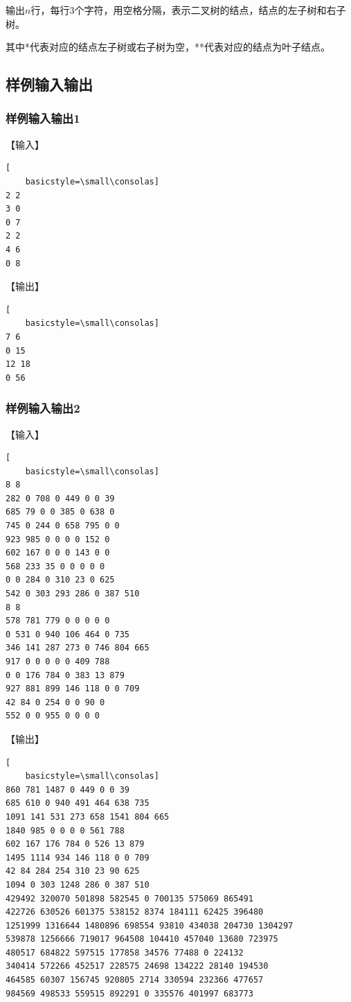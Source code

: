 \documentclass{article}
\begin{document}
输出$n$行，每行3个字符，用空格分隔，表示二叉树的结点，结点的左子树和右子树。

其中*代表对应的结点左子树或右子树为空，**代表对应的结点为叶子结点。

\subsection{样例输入输出}

\subsubsection{样例输入输出1}

【输入】

\begin{lstlisting}[
    basicstyle=\small\consolas]
2 2
3 0
0 7
2 2
4 6
0 8
\end{lstlisting}

【输出】

\begin{lstlisting}[
    basicstyle=\small\consolas]
7 6 
0 15 
12 18 
0 56 
\end{lstlisting}

\subsubsection{样例输入输出2}

【输入】

\begin{lstlisting}[
    basicstyle=\small\consolas]
8 8
282 0 708 0 449 0 0 39
685 79 0 0 385 0 638 0
745 0 244 0 658 795 0 0
923 985 0 0 0 0 152 0
602 167 0 0 0 143 0 0
568 233 35 0 0 0 0 0
0 0 284 0 310 23 0 625
542 0 303 293 286 0 387 510
8 8
578 781 779 0 0 0 0 0
0 531 0 940 106 464 0 735
346 141 287 273 0 746 804 665
917 0 0 0 0 0 409 788
0 0 176 784 0 383 13 879
927 881 899 146 118 0 0 709
42 84 0 254 0 0 90 0
552 0 0 955 0 0 0 0
\end{lstlisting}

【输出】

\begin{lstlisting}[
    basicstyle=\small\consolas]
860 781 1487 0 449 0 0 39 
685 610 0 940 491 464 638 735 
1091 141 531 273 658 1541 804 665 
1840 985 0 0 0 0 561 788 
602 167 176 784 0 526 13 879 
1495 1114 934 146 118 0 0 709 
42 84 284 254 310 23 90 625 
1094 0 303 1248 286 0 387 510 
429492 320070 501898 582545 0 700135 575069 865491 
422726 630526 601375 538152 8374 184111 62425 396480 
1251999 1316644 1480896 698554 93810 434038 204730 1304297 
539878 1256666 719017 964508 104410 457040 13680 723975 
480517 684822 597515 177858 34576 77488 0 224132 
340414 572266 452517 228575 24698 134222 28140 194530 
464585 60307 156745 920805 2714 330594 232366 477657 
984569 498533 559515 892291 0 335576 401997 683773
\end{lstlisting}
\end{document}
